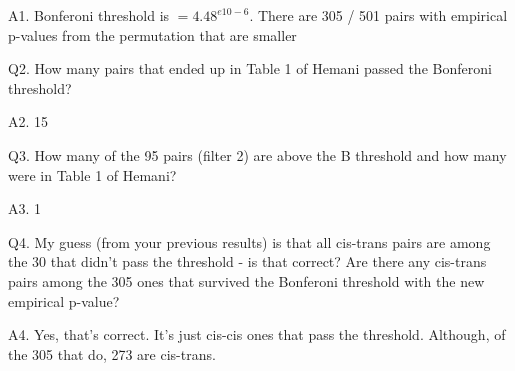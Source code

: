 \documentclass[paper=a4, fontsize=11pt]{scrartcl}         %
\numberwithin{equation}{section}                  %
\numberwithin{figure}{section}                    %
\numberwithin{table}{section}                   %
\begin{document}
A1. Bonferoni threshold is $= 4.48^{e10-6}$. There are 305 / 501 pairs with empirical p-values from the permutation that are smaller  

\vspace{1cm}

Q2. How many pairs that ended up in Table 1 of Hemani passed the Bonferoni threshold?

A2. 15

\vspace{1cm}


Q3. How many of the 95 pairs (filter 2) are above the B threshold and how many were in Table 1 of Hemani?

A3. 1

\vspace{1cm}

Q4. My guess (from your previous results) is that all cis-trans pairs are among the 30 that didn't pass the threshold - is that correct? Are there any cis-trans pairs among the 305 ones that survived the Bonferoni threshold with the new empirical p-value? 

A4. Yes, that's correct. It's just cis-cis ones that pass the threshold. Although, of the 305 that do, 273 are cis-trans.










\end{document}
